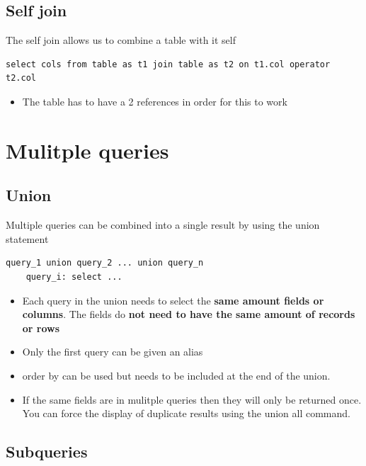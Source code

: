 \documentclass{article}
\begin{document}
\subsection{Self join}

The self join allows us to combine a table with it self 

\begin{lstlisting}[frame=single]
    select cols from table as t1 join table as t2 on t1.col operator t2.col
\end{lstlisting}
\begin{itemize}
    \item The table has to have a 2 references in order for this to work
\end{itemize}

\section{Mulitple queries}

\subsection{Union}

Multiple queries can be combined into a single result by using the union statement 

\begin{lstlisting}[frame=single]
    query_1 union query_2 ... union query_n
    query_i: select ...
\end{lstlisting}
\begin{itemize}
    \item Each query in the union needs to select the \textbf{same amount fields or columns}. The fields do \textbf{not need to have the same amount of records or rows}
    \item Only the first query can be given an alias 
    \item order by can be used but needs to be included at the end of the union. 
    \item If the same fields are in mulitple queries then they will only be returned once. You can force the display of duplicate results using the union all command.
\end{itemize}

\subsection{Subqueries}
\end{document}
